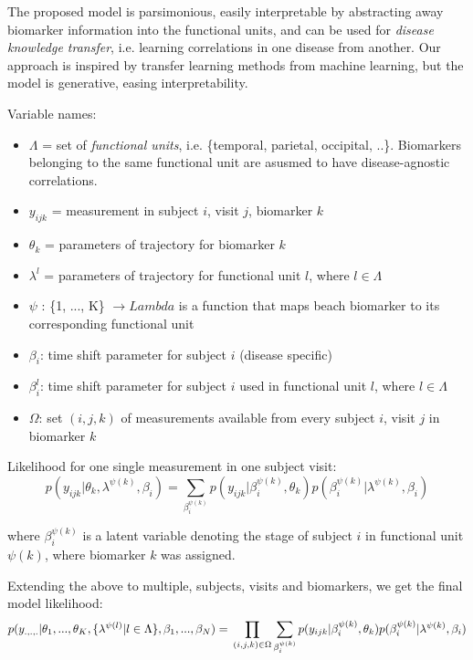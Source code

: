 \documentclass{llncs}
\begin{document}
The proposed model is parsimonious, easily interpretable by abstracting away biomarker information into the functional units, and can be used for \emph{disease knowledge transfer}, i.e. learning correlations in one disease from another. Our approach is inspired by transfer learning methods from machine learning, but the model is generative, easing interpretability.


Variable names:
\begin{itemize}
 \item $\Lambda$ = set of \emph{functional units}, i.e. \{temporal, parietal, occipital, ..\}. Biomarkers belonging to the same functional unit are asusmed to have disease-agnostic correlations.
 \item $y_{ijk}$ = measurement in subject $i$, visit $j$, biomarker $k$
 \item $\theta_k$ = parameters of trajectory for biomarker $k$
 \item $\lambda^l$ = parameters of trajectory for functional unit $l$, where $l \in \Lambda$
 \item $\psi$ : \{1, ..., K\} $ \rightarrow Lambda$ is a function that maps beach biomarker to its corresponding functional unit
 \item $\beta_i$: time shift parameter for subject $i$ (disease specific)
 \item $\beta_i^{l}$: time shift parameter for subject $i$ used in functional unit $l$, where $l \in \Lambda$
 \item $\Omega$: set ${(i,j,k)}$ of measurements available from every subject $i$, visit $j$ in biomarker $k$
\end{itemize}

Likelihood for one single measurement in one subject visit: 
\begin{equation}
 p(y_{ijk}|\theta_k, \lambda^{\psi(k)}, \beta_i) = \sum_{\beta_i^{\psi(k)}} p(y_{ijk}| \beta_i^{\psi(k)}, \theta_k) p(\beta_i^{\psi(k)}| \lambda^{\psi(k)}, \beta_i)
\end{equation}

where $\beta_i^{\psi(k)}$ is a latent variable denoting the stage of subject $i$ in functional unit $\psi(k)$, where biomarker $k$ was assigned.

Extending the above to multiple, subjects, visits and biomarkers, we get the final model likelihood:
\begin{equation}
 p(y_{.,.,.}|\theta_1, ..., \theta_K, \{\lambda^{\psi(l)} | l \in \Lambda \}, \beta_1, ..., \beta_N) = \\ \prod_{(i,j,k) \in \Omega} \sum_{\beta_i^{\psi(k)}} p(y_{ijk}| \beta_i^{\psi(k)}, \theta_k) p(\beta_i^{\psi(k)}| \lambda^{\psi(k)}, \beta_i)
\end{equation}
\end{document}
